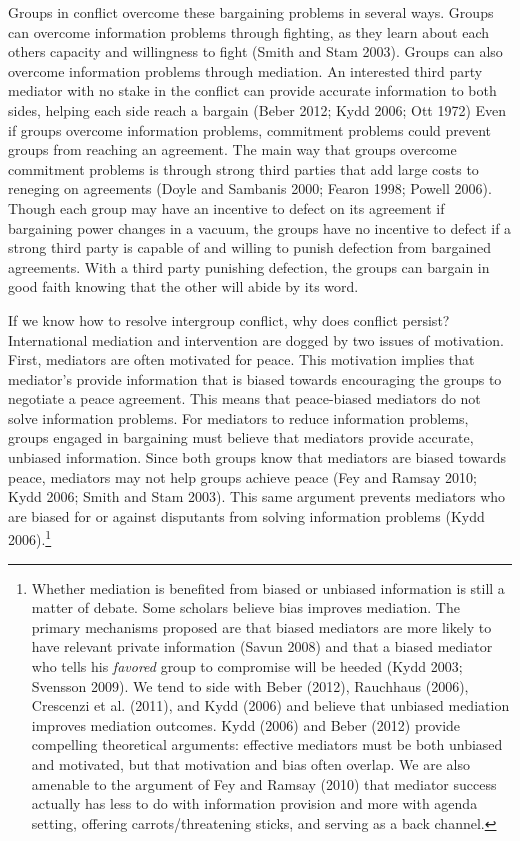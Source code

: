 \documentclass[11pt]{article}
\begin{document}
Groups in conflict overcome these bargaining problems in several ways.
Groups can overcome information problems through fighting, as they learn
about each others capacity and willingness to fight (Smith and Stam
2003). Groups can also overcome information problems through mediation.
An interested third party mediator with no stake in the conflict can
provide accurate information to both sides, helping each side reach a
bargain (Beber 2012; Kydd 2006; Ott 1972) Even if groups overcome
information problems, commitment problems could prevent groups from
reaching an agreement. The main way that groups overcome commitment
problems is through strong third parties that add large costs to
reneging on agreements (Doyle and Sambanis 2000; Fearon 1998; Powell
2006). Though each group may have an incentive to defect on its
agreement if bargaining power changes in a vacuum, the groups have no
incentive to defect if a strong third party is capable of and willing to
punish defection from bargained agreements. With a third party punishing
defection, the groups can bargain in good faith knowing that the other
will abide by its word.

If we know how to resolve intergroup conflict, why does conflict
persist? International mediation and intervention are dogged by two
issues of motivation. First, mediators are often motivated for peace.
This motivation implies that mediator's provide information that is
biased towards encouraging the groups to negotiate a peace agreement.
This means that peace-biased mediators do not solve information
problems. For mediators to reduce information problems, groups engaged
in bargaining must believe that mediators provide accurate, unbiased
information. Since both groups know that mediators are biased towards
peace, mediators may not help groups achieve peace (Fey and Ramsay 2010;
Kydd 2006; Smith and Stam 2003). This same argument prevents mediators
who are biased for or against disputants from solving information
problems (Kydd 2006).\footnote{Whether mediation is benefited from
  biased or unbiased information is still a matter of debate. Some
  scholars believe bias improves mediation. The primary mechanisms
  proposed are that biased mediators are more likely to have relevant
  private information (Savun 2008) and that a biased mediator who tells
  his \emph{favored} group to compromise will be heeded (Kydd 2003;
  Svensson 2009). We tend to side with Beber (2012), Rauchhaus (2006),
  Crescenzi et al. (2011), and Kydd (2006) and believe that unbiased
  mediation improves mediation outcomes. Kydd (2006) and Beber (2012)
  provide compelling theoretical arguments: effective mediators must be
  both unbiased and motivated, but that motivation and bias often
  overlap. We are also amenable to the argument of Fey and Ramsay (2010)
  that mediator success actually has less to do with information
  provision and more with agenda setting, offering carrots/threatening
  sticks, and serving as a back channel.}
\end{document}
